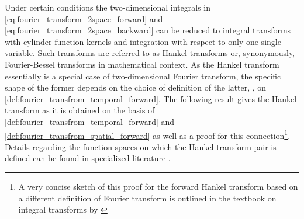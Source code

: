 Under certain conditions the two-dimensional integrals in
\eqref{eq:fourier_transform_2space_forward} and 
\eqref{eq:fourier_transform_2space_backward} can be reduced to integral
transforms with cylinder function kernels and integration with respect to only
one single variable.
Such transforms are referred to as Hankel transforms or, synonymously,
Fourier-Bessel transforms in mathematical context.
As the Hankel transform essentially is a special case of 
two-dimensional Fourier transform, the specific shape of the former depends on
the choice of definition of the latter, \ie, on
\cref{def:fourier_transfrom_temporal_forward}.
The following result gives the Hankel transform as it is obtained on the
basis of \cref{def:fourier_transfrom_temporal_forward} and
\cref{def:fourier_transfrom_spatial_forward} as well as a proof for this
connection\footnote{A very concise sketch of this proof for the forward Hankel
transform based on a different definition of Fourier transform is outlined in
the textbook on integral transforms by \textcite[229]{Davies2002}}.
Details regarding the function spaces on which the Hankel transform pair is
defined can be found in specialized literature \cite{Patra2018,Davies2002}.

